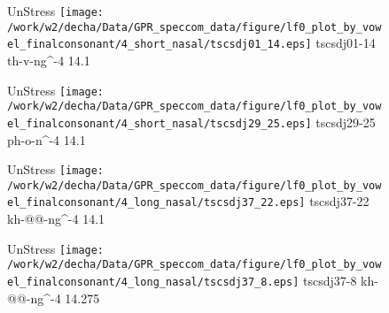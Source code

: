 \documentclass{article}
\begin{document}
\begin{figure}[t]
\begin{minipage}[b]{.24\textwidth}
UnStress
\centering
\texttt{[image: /work/w2/decha/Data/GPR\_speccom\_data/figure/lf0\_plot\_by\_vowel\_finalconsonant/4\_short\_nasal/tscsdj01\_14.eps]}
tscsdj01-14 th-v-ng\textasciicircum-4 14.1
\end{minipage}
\begin{minipage}[b]{.24\textwidth}
UnStress
\centering
\texttt{[image: /work/w2/decha/Data/GPR\_speccom\_data/figure/lf0\_plot\_by\_vowel\_finalconsonant/4\_short\_nasal/tscsdj29\_25.eps]}
tscsdj29-25 ph-o-n\textasciicircum-4 14.1
\end{minipage}
\begin{minipage}[b]{.24\textwidth}
UnStress
\centering
\texttt{[image: /work/w2/decha/Data/GPR\_speccom\_data/figure/lf0\_plot\_by\_vowel\_finalconsonant/4\_long\_nasal/tscsdj37\_22.eps]}
tscsdj37-22 kh-@@-ng\textasciicircum-4 14.1
\end{minipage}
\begin{minipage}[b]{.24\textwidth}
UnStress
\centering
\texttt{[image: /work/w2/decha/Data/GPR\_speccom\_data/figure/lf0\_plot\_by\_vowel\_finalconsonant/4\_long\_nasal/tscsdj37\_8.eps]}
tscsdj37-8 kh-@@-ng\textasciicircum-4 14.275
\end{minipage}
\end{figure}
\end{document}
